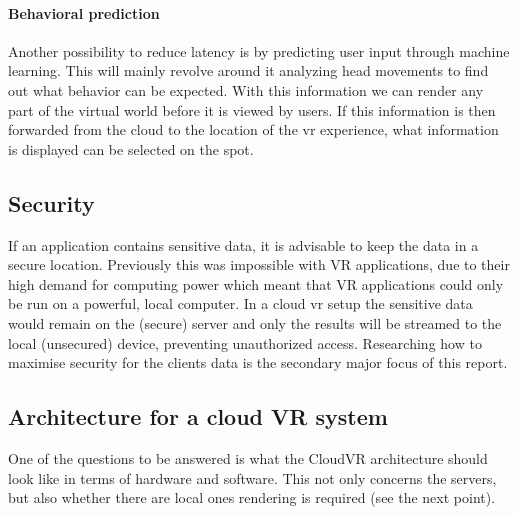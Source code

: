 \paragraph{Behavioral prediction}
Another possibility to reduce latency is by predicting
user input through machine learning. This will mainly revolve around it
analyzing head movements to find out what behavior can be expected. With
this information we can render any part of the virtual world before it
is viewed by users. If this information is then forwarded from the
cloud to the location of the \acrshort{vr} experience, what information is displayed can be selected on the spot.

\subsection{Security}
If an application contains sensitive data, it is advisable to keep the data in a secure location. Previously this was impossible with VR applications, due to their high demand for computing power which meant that VR applications could only be run on a powerful, local computer. In a cloud \acrshort{vr} setup the sensitive data would remain on the (secure) server and only the results will be streamed to the local (unsecured) device, preventing unauthorized access. Researching how to maximise security for the clients data is the secondary major focus of this report.

\subsection{Architecture for a cloud VR system}
One of the questions to be answered is what the CloudVR architecture should look like
in terms of hardware and software. This not only concerns the servers, but also whether there are local ones
rendering is required (see the next point).